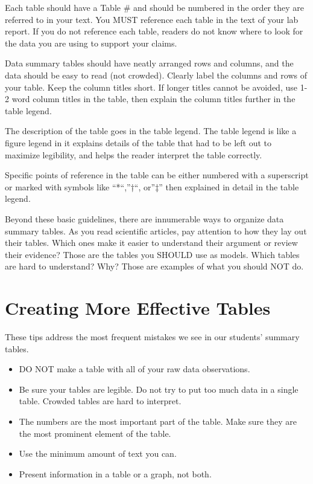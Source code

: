 \documentclass[
]{book}
\providecommand{\tightlist}{%
  \setlength{\itemsep}{0pt}\setlength{\parskip}{0pt}}
\begin{document}
Each table should have a Table \# and should be numbered in the order they are referred to in your text. You MUST reference each table in the text of your lab report. If you do not reference each table, readers do not know where to look for the data you are using to support your claims.

Data summary tables should have neatly arranged rows and columns, and the data should be easy to read (not crowded). Clearly label the columns and rows of your table. Keep the column titles short. If longer titles cannot be avoided, use 1-2 word column titles in the table, then explain the column titles further in the table legend.

The description of the table goes in the table legend. The table legend is like a figure legend in it explains details of the table that had to be left out to maximize legibility, and helps the reader interpret the table correctly.

Specific points of reference in the table can be either numbered with a superscript or marked with symbols like ``*``,''†``, or''‡'' then explained in detail in the table legend.

Beyond these basic guidelines, there are innumerable ways to organize data summary tables. As you read scientific articles, pay attention to how they lay out their tables. Which ones make it easier to understand their argument or review their evidence? Those are the tables you SHOULD use as models. Which tables are hard to understand? Why? Those are examples of what you should NOT do.

\hypertarget{creating-more-effective-tables}{%
\section{Creating More Effective Tables}\label{creating-more-effective-tables}}

These tips address the most frequent mistakes we see in our students' summary tables.

\begin{itemize}
\tightlist
\item
  DO NOT make a table with all of your raw data observations.
\item
  Be sure your tables are legible. Do not try to put too much data in a single table. Crowded tables are hard to interpret.
\item
  The numbers are the most important part of the table. Make sure they are the most prominent element of the table.
\item
  Use the minimum amount of text you can.
\item
  Present information in a table or a graph, not both.
\end{itemize}
\end{document}

